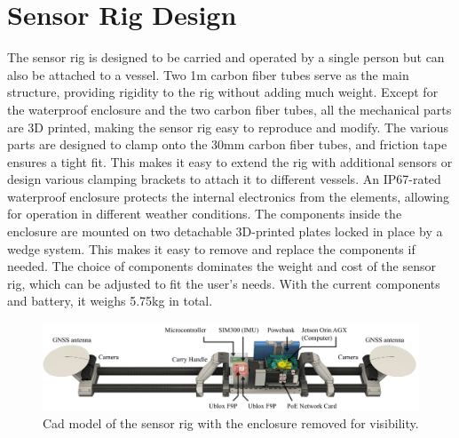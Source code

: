 \section{Sensor Rig Design}
The sensor rig is designed to be carried and operated by a single person but can also be attached to a vessel.
Two 1m carbon fiber tubes serve as the main structure, providing rigidity to the rig without adding much weight.
Except for the waterproof enclosure and the two carbon fiber tubes, all the mechanical parts are 3D printed, making the sensor rig easy to reproduce and modify.
The various parts are designed to clamp onto the 30mm carbon fiber tubes, and friction tape ensures a tight fit.
This makes it easy to extend the rig with additional sensors or design various clamping brackets to attach it to different vessels.
An IP67-rated waterproof enclosure protects the internal electronics from the elements, allowing for operation in different weather conditions.
The components inside the enclosure are mounted on two detachable 3D-printed plates locked in place by a wedge system. This makes it easy to remove and replace the components if needed.
The choice of components dominates the weight and cost of the sensor rig, which can be adjusted to fit the user's needs.
With the current components and battery, it weighs 5.75kg in total.

\begin{figure}[H]
    \centering
    \includegraphics[width=\textwidth]{figures/rig_components.pdf}
    \caption{Cad model of the sensor rig with the enclosure removed for visibility.}
\end{figure}

